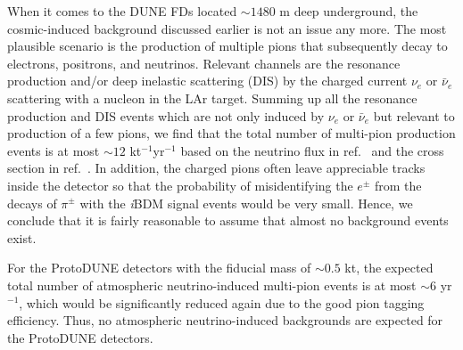 When it comes to the DUNE FDs located $\sim 1480$ m deep underground, the cosmic-induced background discussed earlier is not an issue any more. 
The most plausible scenario is the production of multiple pions that subsequently decay to electrons, positrons, and neutrinos. 
Relevant channels are the resonance production and/or deep inelastic scattering (DIS) by the charged current $\nu_e$ or $\bar \nu_e$ scattering with a nucleon in the LAr target.
Summing up all the resonance production and DIS events which are not only induced by $\nu_e$ or $\bar \nu_e$ 
but relevant to production of a few pions, we find that the total number of multi-pion production events is at most $\sim 12$ kt$^{-1}$yr$^{-1}$ based on the neutrino flux in ref.~\cite{Honda:2015fha} and the cross section in ref.~\cite{Formaggio:2013kya}.
In addition, the charged pions often leave appreciable tracks inside the detector so that the probability of misidentifying the $e^\pm$ from the decays of $\pi^\pm$ with the {\it i}BDM signal events would be very small.
Hence, we conclude that it is fairly reasonable to assume that almost no background events exist.

For the ProtoDUNE detectors with the fiducial mass of $\sim0.5$ kt, the expected total number of atmospheric neutrino-induced multi-pion events is at most $\sim 6$ yr$^{-1}$, which would be significantly reduced again due to the good pion tagging efficiency. 
Thus, no atmospheric neutrino-induced backgrounds are expected for the ProtoDUNE detectors.  


